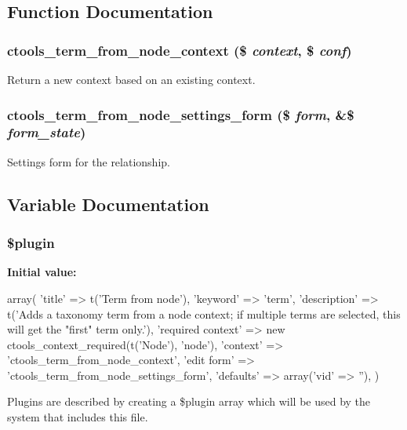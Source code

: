 \subsection{Function Documentation}
\hypertarget{term__from__node_8inc_ad85e31a6ee118e9c98a7c3279394f7ac}{
\subsubsection[{ctools\_\-term\_\-from\_\-node\_\-context}]{\setlength{\rightskip}{0pt plus 5cm}ctools\_\-term\_\-from\_\-node\_\-context (\$ {\em context}, \/  \$ {\em conf})}}
\label{term__from__node_8inc_ad85e31a6ee118e9c98a7c3279394f7ac}
Return a new context based on an existing context. \hypertarget{term__from__node_8inc_a11e292e2f395a362d9b703b6cc410095}{
\subsubsection[{ctools\_\-term\_\-from\_\-node\_\-settings\_\-form}]{\setlength{\rightskip}{0pt plus 5cm}ctools\_\-term\_\-from\_\-node\_\-settings\_\-form (\$ {\em form}, \/  \&\$ {\em form\_\-state})}}
\label{term__from__node_8inc_a11e292e2f395a362d9b703b6cc410095}
Settings form for the relationship. 

\subsection{Variable Documentation}
\hypertarget{term__from__node_8inc_ada8a7130088351710bb02ed622d6bf65}{
\subsubsection[{\$plugin}]{\setlength{\rightskip}{0pt plus 5cm}\$plugin}}
\label{term__from__node_8inc_ada8a7130088351710bb02ed622d6bf65}
{\bfseries Initial value:}
\begin{DoxyCode}
 array(
  'title' => t('Term from node'),
  'keyword' => 'term',
  'description' => t('Adds a taxonomy term from a node context; if multiple terms
       are selected, this will get the "first" term only.'),
  'required context' => new ctools_context_required(t('Node'), 'node'),
  'context' => 'ctools_term_from_node_context',
  'edit form' => 'ctools_term_from_node_settings_form',
  'defaults' => array('vid' => ''),
)
\end{DoxyCode}
Plugins are described by creating a \$plugin array which will be used by the system that includes this file. 